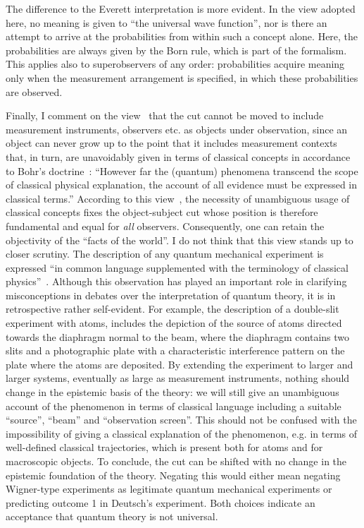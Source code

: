 \documentclass[12pt,a4]{article}
\begin{document}
The difference to the Everett interpretation is more evident. In the view adopted here, no meaning is given to ``the universal wave function'', nor is there an attempt to arrive at the probabilities from within such a concept alone. Here, the probabilities are always given by the Born rule, which is part of the formalism. This applies also to superobservers of any order: probabilities acquire meaning only when the measurement arrangement is specified, in which these probabilities are observed. 

Finally, I comment on the view~\cite{grangier} that the cut cannot be moved to include measurement instruments, observers etc. as objects under observation, since an object can never grow up to the point that it includes measurement contexts that, in turn, are unavoidably given in terms of classical concepts in accordance to Bohr's doctrine~\cite{bohr1}: ``However far the (quantum) phenomena transcend the scope of classical physical explanation, the account of all evidence must be expressed in classical terms.'' According to this view~\cite{grangier}, the necessity of unambiguous usage of classical concepts fixes the object-subject cut whose position is therefore fundamental and equal for {\it all} observers. Consequently, one can retain the objectivity of the ``facts of the world''. I do not think that this view stands up to closer scrutiny. The description of any quantum mechanical experiment is expressed ``in common language supplemented with the terminology of classical physics''~\cite{bohr4}. Although this observation has played an important role in clarifying misconceptions in debates over the interpretation of quantum theory, it is in retrospective rather self-evident. For example, the description of a double-slit experiment with atoms, includes the depiction of the source of atoms directed towards the diaphragm normal to the beam, where the diaphragm contains two slits and a photographic plate with a characteristic interference pattern on the plate where the atoms are deposited. By extending the experiment to larger and larger systems, eventually as large as measurement instruments, nothing should change in the epistemic basis of the theory: we will still give an unambiguous account of the phenomenon in terms of classical language including a suitable ``source'', ``beam'' and ``observation screen''. This should not be confused with the impossibility of giving a classical explanation of the phenomenon, e.g. in terms of  well-defined classical trajectories, which is present both for atoms and for macroscopic objects. To conclude, the cut can be shifted with no change in the epistemic foundation of the theory. Negating this would either mean negating Wigner-type experiments as legitimate quantum mechanical experiments or predicting outcome 1 in Deutsch's experiment. Both choices indicate an acceptance that quantum theory is not universal. 
\end{document}
